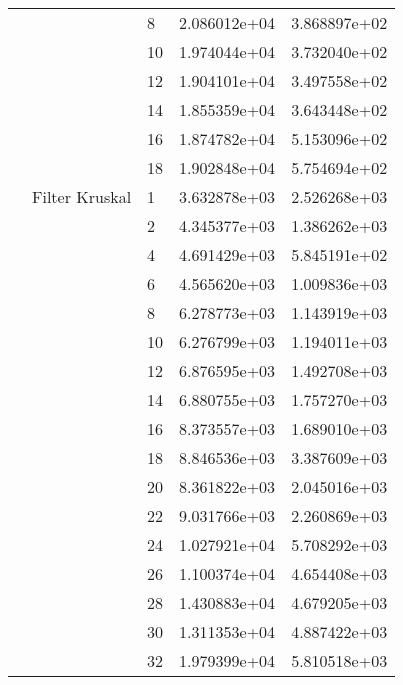 \begin{tabular}{lllrr}
                      &            & 8  &  2.086012e+04 &  3.868897e+02 \\
                      &            & 10 &  1.974044e+04 &  3.732040e+02 \\
                      &            & 12 &  1.904101e+04 &  3.497558e+02 \\
                      &            & 14 &  1.855359e+04 &  3.643448e+02 \\
                      &            & 16 &  1.874782e+04 &  5.153096e+02 \\
                      &            & 18 &  1.902848e+04 &  5.754694e+02 \\
                      & Filter Kruskal & 1  &  3.632878e+03 &  2.526268e+03 \\
                      &            & 2  &  4.345377e+03 &  1.386262e+03 \\
                      &            & 4  &  4.691429e+03 &  5.845191e+02 \\
                      &            & 6  &  4.565620e+03 &  1.009836e+03 \\
                      &            & 8  &  6.278773e+03 &  1.143919e+03 \\
                      &            & 10 &  6.276799e+03 &  1.194011e+03 \\
                      &            & 12 &  6.876595e+03 &  1.492708e+03 \\
                      &            & 14 &  6.880755e+03 &  1.757270e+03 \\
                      &            & 16 &  8.373557e+03 &  1.689010e+03 \\
                      &            & 18 &  8.846536e+03 &  3.387609e+03 \\
                      &            & 20 &  8.361822e+03 &  2.045016e+03 \\
                      &            & 22 &  9.031766e+03 &  2.260869e+03 \\
                      &            & 24 &  1.027921e+04 &  5.708292e+03 \\
                      &            & 26 &  1.100374e+04 &  4.654408e+03 \\
                      &            & 28 &  1.430883e+04 &  4.679205e+03 \\
                      &            & 30 &  1.311353e+04 &  4.887422e+03 \\
                      &            & 32 &  1.979399e+04 &  5.810518e+03 \\

\end{tabular}
